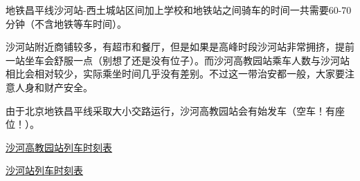 地铁昌平线沙河站-西土城站区间加上学校和地铁站之间骑车的时间一共需要60-70分钟（不含地铁等车时间）。

沙河站附近商铺较多，有超市和餐厅，但是如果是高峰时段沙河站非常拥挤，提前一站坐车会舒服一点（别想了还是没有位子）。而沙河高教园站乘车人数与沙河站相比会相对较少，实际乘坐时间几乎没有差别。不过这一带治安都一般，大家要注意人身和财产安全。

由于北京地铁昌平线采取大小交路运行，沙河高教园站会有始发车（空车！有座位！）。

\href{https://www.bjsubway.com/station/xltcx/linecp/2013-08-26/246.html?sk=1}{沙河高教园站列车时刻表}

\href{https://www.bjsubway.com/station/xltcx/linecp/2013-08-26/249.html?sk=1}{沙河站列车时刻表}
